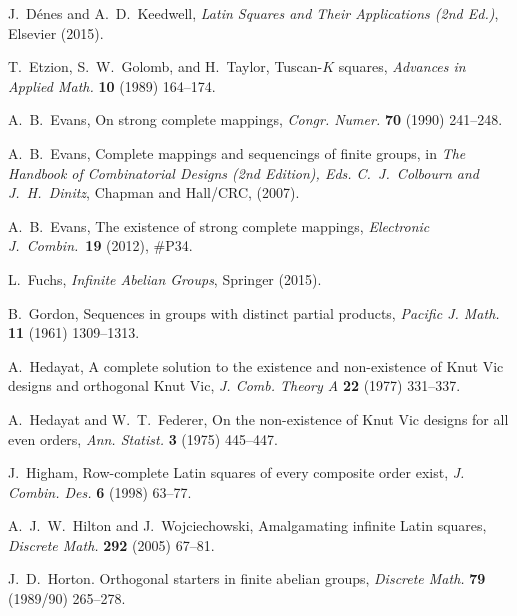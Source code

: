 \documentclass[12pt,a4paper]{article}
\begin{document}
\begin{thebibliography}{99}
J.~D{\'e}nes and A.~D.~Keedwell, {\em Latin Squares and Their Applications (2nd Ed.)}, Elsevier (2015).

T.~Etzion, S.~W.~Golomb, and H.~Taylor, Tuscan-$K$ squares, {\em Advances in Applied Math.} {\bf 10} (1989) 164--174.

A.~B.~Evans, On strong complete mappings, {\em Congr. Numer.} {\bf 70} (1990) 241--248.

A.~B.~Evans, 
Complete mappings and sequencings of finite groups, in {\em The Handbook of Combinatorial Designs (2nd Edition), Eds. C.~J.~Colbourn and J.~H.~Dinitz}, Chapman and Hall/CRC, (2007).

A.~B.~Evans, The existence of strong complete mappings, {\em Electronic J.~Combin.}~{\bf 19} (2012), \#P34.

L.~Fuchs, {\em Infinite Abelian Groups}, Springer (2015).



 B.~Gordon, Sequences in groups with distinct partial products, {\em Pacific J. Math.} {\bf 11} (1961) 1309--1313.

 A.~Hedayat, A complete solution to the existence and non-existence of Knut Vic designs and orthogonal Knut Vic, {\em J. Comb. Theory A} {\bf 22}  (1977) 331--337.

 A.~Hedayat and W.~T.~Federer, On the non-existence of Knut Vic designs for all even orders, {\em Ann. Statist.} {\bf 3} (1975) 445--447.

J.~Higham, Row-complete Latin squares of every composite order exist, {\em J. Combin. Des.} {\bf 6} (1998) 63--77. 

A.~J.~W.~Hilton and J.~Wojciechowski, Amalgamating infinite Latin squares, {\em Discrete Math.} {\bf 292} (2005) 67--81.

J.~D.~Horton. Orthogonal starters in finite abelian groups, {\em Discrete Math.} {\bf 79} (1989/90) 265--278. 



\end{thebibliography}
\end{document}
